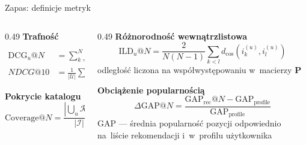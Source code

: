 \documentclass[aspectratio=169,11pt]{beamer}
\makeatletter
\newcommand{\ndcg}{NDCG@10}
\makeatother
\begin{document}
\begin{frame}{Zapas: definicje metryk}

  \small
  \begin{columns}[t]
    \begin{column}{0.49\textwidth}
      \textbf{Trafność}
      \begin{align*}
        \text{DCG}_u@N &= \sum_{k=1}^{N}
          \frac{\mathbf{1}\!\left(i_k^{(u)} \in \mathcal{I}_u^{\text{test}}\right)}{\log_2(k+1)} \\[0.5em]
        \ndcg{} &= \frac{1}{|\mathcal{U}|}\sum_{u}
          \frac{\text{DCG}_u@N}{\text{IDCG}_u@N}
      \end{align*}

      \vspace{0.5em}
      \textbf{Pokrycie katalogu}
      \begin{equation*}
        \text{Coverage}@N =
        \frac{\left|\bigcup_{u} \mathcal{R}_u^N\right|}{|\mathcal{I}|}
      \end{equation*}
    \end{column}

    \begin{column}{0.49\textwidth}
      \textbf{Różnorodność wewnątrzlistowa}
      \begin{equation*}
        \text{ILD}_u@N = \frac{2}{N(N-1)}
        \sum_{k<l} d_{\cos}\!\left(i_k^{(u)}, i_l^{(u)}\right)
      \end{equation*}
      \scriptsize odległość liczona na współwystępowaniu w~macierzy $\mathbf{P}$

      \vspace{1em}
      \small
      \textbf{Obciążenie popularnością}
      \begin{equation*}
        \Delta\text{GAP}@N =
        \frac{\text{GAP}_{\text{rec}}@N - \text{GAP}_{\text{profile}}}{\text{GAP}_{\text{profile}}}
      \end{equation*}
      \scriptsize $\text{GAP}$ --- średnia popularność pozycji odpowiednio
      na~liście rekomendacji i~w~profilu użytkownika
    \end{column}
  \end{columns}

\end{frame}
\end{document}
